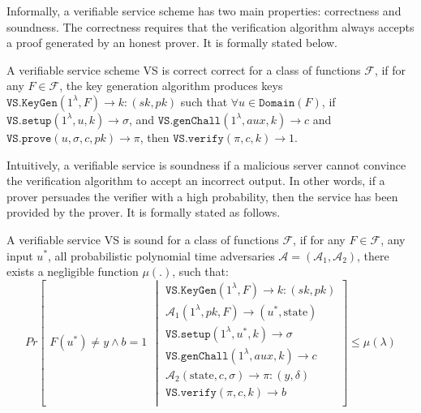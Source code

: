 Informally, a verifiable service scheme has two main properties: correctness and soundness. The correctness requires that  the verification algorithm always accepts a proof generated by an honest prover.  It is formally stated below.

\begin{definition}[Correctness] A verifiable service scheme VS is correct correct for a class of functions $\mathcal{F}$, if for any $F \in \mathcal{F}$, the key generation algorithm produces keys $\mathtt{VS.KeyGen}(1^{\lambda},F)\rightarrow k:(sk,pk)$ such that  $\forall u \in \mathtt{Domain}(F)$, if $\mathtt{VS.setup}(1^{\lambda}, u,k)\rightarrow \sigma$, and $\mathtt{VS.genChall}(1^{\lambda}, aux,k)\rightarrow c$ and $\mathtt{VS.prove}(u,\sigma,c,pk)\rightarrow \pi$, then $\mathtt{VS.verify}(\pi,c,k)\rightarrow 1$.
\end{definition}

Intuitively, a verifiable service is soundness  if a malicious server cannot convince the verification algorithm to accept an incorrect output. In other words, if a prover persuades the verifier with a high probability, then the service has been provided by the prover. It is  formally stated as follows.




\begin{definition}[Soundness] A verifiable service VS is sound for a class of functions $\mathcal{F}$, if for any $F \in \mathcal{F}$, any input $u^*$, all probabilistic polynomial time adversaries $\mathcal{A}=(\mathcal{A}_{\scriptscriptstyle 1},\mathcal{A}_{\scriptscriptstyle 2})$, there exists a negligible function $\mu(.)$, such that: 
\small{
$$ Pr\left[
  \begin{array}{l}
F(u^*)\neq y \wedge b=1
\end{array} \middle |
    \begin{array}{l}
    \mathtt{VS.KeyGen}(1^{\lambda},F)\rightarrow k:(sk,pk)\\
    \mathcal{A}_{\scriptscriptstyle 1}(1^{\scriptscriptstyle\lambda},pk, F)\rightarrow (u^*,\text{state})\\
    \mathtt{VS.setup}(1^{\lambda}, u^*,k)\rightarrow \sigma\\
    \mathtt{VS.genChall}(1^{\lambda}, aux,k)\rightarrow c\\
     \mathcal{A}_{\scriptscriptstyle 2}(\text{state},c,\sigma)\rightarrow \pi:(y,\delta)\\
     \mathtt{VS.verify}(\pi,c,k)\rightarrow b\\
\end{array}    \right]\leq \mu(\lambda)$$
}
\end{definition}



